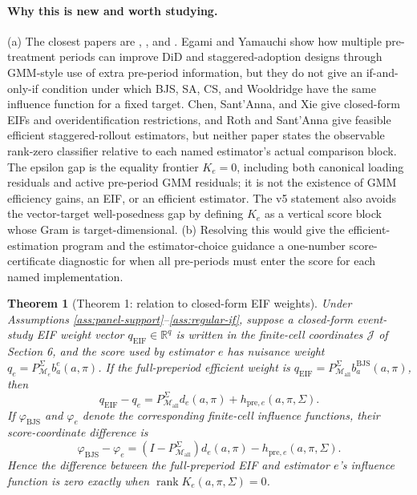 \documentclass[11pt]{article}
\newcommand{\R}{\mathbb{R}}
\theoremstyle{definition}
\theoremstyle{plain}
\newtheorem{theorem}{Theorem}
\theoremstyle{remark}
\begin{document}
\paragraph{Why this is new and worth studying.}
(a) The closest papers are \citet{EgamiYamauchi2023},
\citet{ChenSantAnnaXie2025}, and \citet{RothSantAnna2023Efficient}.  Egami and
Yamauchi show how multiple pre-treatment periods can improve DiD and
staggered-adoption designs through GMM-style use of extra pre-period
information, but they do not give an if-and-only-if condition under which BJS,
SA, CS, and Wooldridge have the same influence function for a fixed target.
Chen, Sant'Anna, and Xie give closed-form EIFs and overidentification
restrictions, and Roth and Sant'Anna give feasible efficient
staggered-rollout estimators, but neither paper states the observable
rank-zero classifier relative to each named estimator's actual comparison
block.  The epsilon gap is the equality frontier \(K_e=0\), including both
canonical loading residuals and active pre-period GMM residuals; it is not the
existence of GMM efficiency gains, an EIF, or an efficient estimator.  The v5
statement also avoids the vector-target well-posedness gap by defining
\(K_e\) as a vertical score block whose Gram is target-dimensional.  (b)
Resolving this would give the
\citet{ChenSantAnnaXie2025} efficient-estimation program and the
\citet{RothSantAnnaBilinskiPoe2023} estimator-choice guidance a one-number
score-certificate diagnostic for when all pre-periods must enter the score for
each named implementation.

\begin{theorem}[Theorem 1: relation to closed-form EIF weights]\label{thm:csx-comparison}
Under Assumptions \ref{ass:panel-support}--\ref{ass:regular-if}, suppose a
closed-form event-study EIF weight vector \(q_{\mathrm{EIF}}\in\R^q\) is
written in the finite-cell coordinates \(\mathcal J\) of Section 6, and the
score used by estimator \(e\) has nuisance weight
\(q_e=P_{\mathcal M_e}^{\Sigma}b_a^e(a,\pi)\).  If the full-preperiod efficient
weight is
\(q_{\mathrm{EIF}}=P_{\mathcal M_{\mathrm{all}}}^{\Sigma}
b_a^{\mathrm{BJS}}(a,\pi)\), then
\[
  q_{\mathrm{EIF}}-q_e
  =P_{\mathcal M_{\mathrm{all}}}^{\Sigma}d_e(a,\pi)
   +h_{\mathrm{pre},e}(a,\pi,\Sigma).
\]
If \(\varphi_{\mathrm{BJS}}\) and \(\varphi_e\) denote the corresponding
finite-cell influence functions, their score-coordinate difference is
\[
  \varphi_{\mathrm{BJS}}-\varphi_e
  =(I-P_{\mathcal M_{\mathrm{all}}}^{\Sigma})d_e(a,\pi)
   -h_{\mathrm{pre},e}(a,\pi,\Sigma).
\]
Hence the difference between the full-preperiod EIF and estimator \(e\)'s
influence function is zero exactly when
\(\operatorname{rank}K_e(a,\pi,\Sigma)=0\).
\end{theorem}
\end{document}

